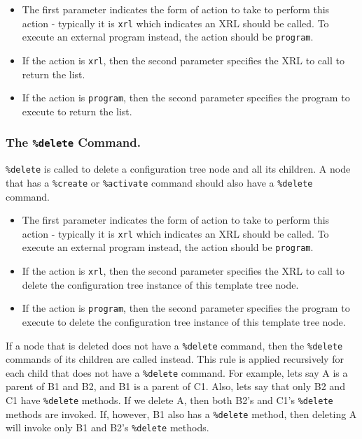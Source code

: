 \documentclass[11pt]{article}
\begin{document}
\begin{itemize}
  \item The first parameter indicates the form of action to take to perform
   this action - typically it is {\tt xrl} which indicates an XRL should
   be called.
   To execute an external program instead, the action should be {\tt program}.

  \item If the action is {\tt xrl}, then the second parameter specifies the
   XRL to call to return the list.

  \item If the action is {\tt program}, then the second parameter specifies the
   program to execute to return the list.

\end{itemize}

\subsubsection{The {\tt \%delete} Command.}
{\tt \%delete} is called to delete a configuration tree node and all its
children.  A node that has a {\tt \%create} or {\tt \%activate}
command should also have a {\tt \%delete} command.

\begin{itemize}
  \item The first parameter indicates the form of action to take to perform
   this action - typically it is {\tt xrl} which indicates an XRL should
   be called.
   To execute an external program instead, the action should be {\tt program}.

  \item If the action is {\tt xrl}, then the second parameter specifies the
   XRL to call to delete the configuration tree instance of this template
   tree node.

  \item If the action is {\tt program}, then the second parameter specifies the
   program to execute to delete the configuration tree instance of this
   template tree node.

\end{itemize}

If a node that is deleted does not have a {\tt \%delete} command, then
the {\tt \%delete} commands of its children are called instead.
This rule is applied recursively for each child that does not have
a {\tt \%delete} command.
For example, lets say A is a parent of B1 and B2, and B1 is a parent of C1.
Also, lets say that only B2 and C1 have {\tt \%delete} methods.
If we delete A, then both B2's and C1's {\tt \%delete} methods are invoked.
If, however, B1 also has a {\tt \%delete} method, then deleting A will invoke
only B1 and B2's {\tt \%delete} methods.
\end{document}
